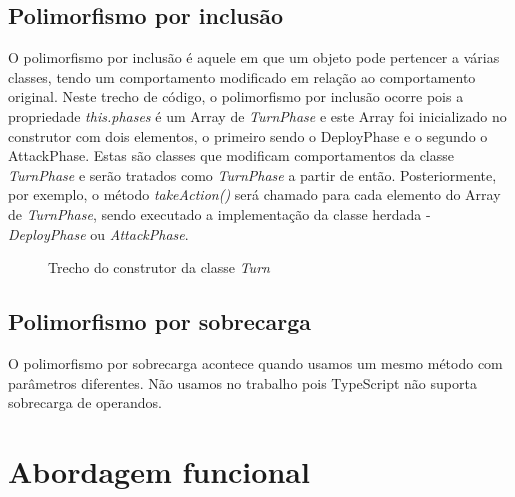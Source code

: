 \documentclass[rel_mlp]{iiufrgs}
\numberwithin{figure}{chapter}
\begin{document}


\section{Polimorfismo por inclusão}

O polimorfismo por inclusão é aquele em que um objeto pode pertencer a várias classes, tendo um comportamento modificado em relação ao comportamento original. 
Neste trecho de código, o polimorfismo por inclusão ocorre pois a propriedade \textit{this.phases} é um Array de \textit{TurnPhase} e este Array foi inicializado no construtor com dois elementos, o primeiro sendo o DeployPhase e o segundo o AttackPhase. Estas são classes que modificam comportamentos da classe \textit{TurnPhase} e serão tratados como \textit{TurnPhase} a partir de então. Posteriormente, por exemplo, o método \textit{takeAction()} será chamado para cada elemento do Array de \textit{TurnPhase}, sendo executado a implementação da classe herdada - \textit{DeployPhase} ou \textit{AttackPhase}.

\begin{figure}[ht]
\centering {
	
}
%
%
\caption{Trecho do construtor da classe \textit{Turn}}
\label{fig:tsClass}
\end{figure}

\section{Polimorfismo por sobrecarga}

O polimorfismo por sobrecarga acontece quando usamos um mesmo método com parâmetros diferentes. Não usamos no trabalho pois TypeScript não suporta sobrecarga de operandos.


%
\chapter{Abordagem funcional}
\end{document}
